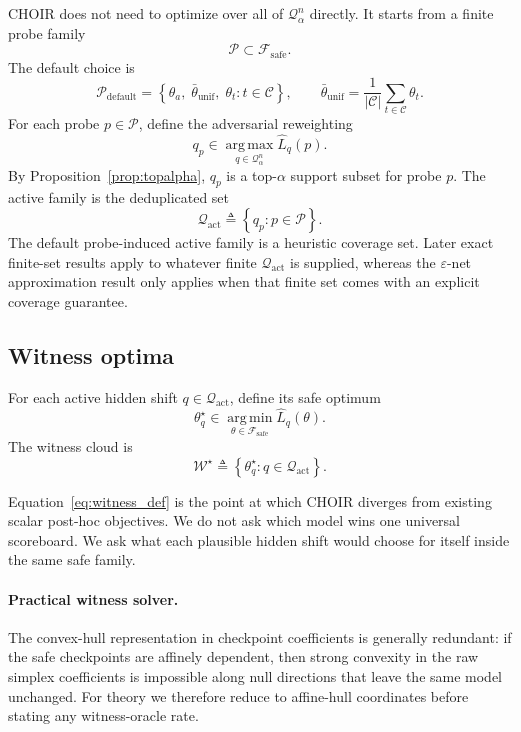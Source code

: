 \documentclass{article}
\newcommand{\cC}{\mathcal{C}}
\newcommand{\cF}{\mathcal{F}}
\newcommand{\cP}{\mathcal{P}}
\newcommand{\cQ}{\mathcal{Q}}
\newcommand{\cW}{\mathcal{W}}
\newcommand{\argmin}{\operatorname*{arg\,min}}
\newcommand{\argmax}{\operatorname*{arg\,max}}
\newcommand{\choir}{\textup{\textsc{CHOIR}}}
\newcommand{\braces}[1]{\left\{ #1 \right\}}
\newcommand{\safe}{\mathrm{safe}}
\newcommand{\act}{\mathrm{act}}
\begin{document}
\choir{} does not need to optimize over all of \(\cQ_\alpha^n\) directly. It starts from a finite probe family
\[
\cP \subset \cF_{\safe}.
\]
The default choice is
\[
\cP_{\mathrm{default}}
=
\braces{
\theta_a,\;
\bar{\theta}_{\mathrm{unif}},\;
\theta_t : t\in\cC
},
\qquad
\bar{\theta}_{\mathrm{unif}}
=
\frac{1}{|\cC|}\sum_{t\in\cC}\theta_t.
\]
For each probe \(p\in\cP\), define the adversarial reweighting
\[
q_p \in \argmax_{q\in\cQ_\alpha^n} \widehat L_q(p).
\]
By Proposition~\ref{prop:topalpha}, \(q_p\) is a top-\(\alpha\) support subset for probe \(p\). The active family is the deduplicated set
\begin{equation}
\cQ_{\act}
\triangleq
\braces{q_p : p\in\cP}.
\label{eq:active_set}
\end{equation}
The default probe-induced active family is a heuristic coverage set. Later exact finite-set results apply to whatever finite \(\cQ_{\act}\) is supplied, whereas the \(\varepsilon\)-net approximation result only applies when that finite set comes with an explicit coverage guarantee.

\subsection{Witness optima}

For each active hidden shift \(q\in\cQ_{\act}\), define its safe optimum
\begin{equation}
\theta_q^\star
\in
\argmin_{\theta\in\cF_{\safe}}
\widehat L_q(\theta).
\label{eq:witness_def}
\end{equation}
The witness cloud is
\[
\cW^\star \triangleq \braces{\theta_q^\star : q\in\cQ_{\act}}.
\]

Equation~\eqref{eq:witness_def} is the point at which \choir{} diverges from existing scalar post-hoc objectives. We do not ask which model wins one universal scoreboard. We ask what each plausible hidden shift would choose for itself inside the same safe family.

\paragraph{Practical witness solver.}
The convex-hull representation in checkpoint coefficients is generally redundant: if the safe checkpoints are affinely dependent, then strong convexity in the raw simplex coefficients is impossible along null directions that leave the same model unchanged. For theory we therefore reduce to affine-hull coordinates before stating any witness-oracle rate.
\end{document}

